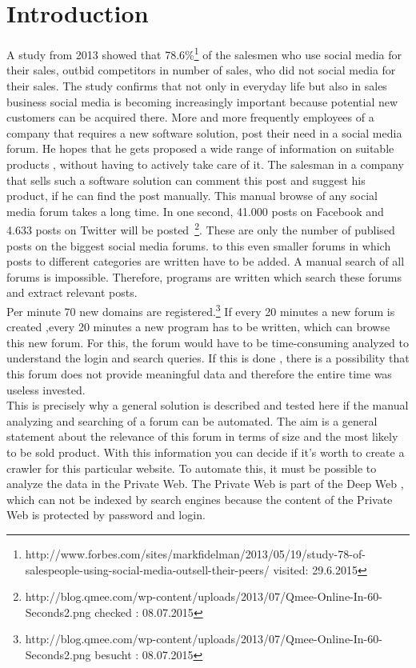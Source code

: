 \section{Introduction}
A study from 2013 showed that 78.6\%\footnote{http://www.forbes.com/sites/markfidelman/2013/05/19/study-78-of-salespeople-using-social-media-outsell-their-peers/ visited: 29.6.2015} of the salesmen who use social media for their sales, outbid competitors in number of sales, who did not social media for their sales.
The study confirms that not only in everyday life but also in sales business social media is becoming increasingly important because potential new customers can be acquired there. More and more frequently employees of a company that requires a new software solution, post their need in a social media forum. He hopes that he gets proposed a wide range of information on suitable products , without having to actively take care of it. The salesman in a company that sells such a software solution can comment this post and suggest his product, if he can find the post manually.
This manual browse of any social media forum takes a long time. In one second, 41.000 posts on Facebook and 4.633 posts on Twitter will be posted~\footnote{http://blog.qmee.com/wp-content/uploads/2013/07/Qmee-Online-In-60-Seconds2.png checked : 08.07.2015}. These are only the number of publised posts on the biggest social media forums. to this even smaller forums in which posts to different categories are written have to be added. A manual search of all forums is impossible. Therefore, programs are written which search these forums and extract relevant posts.\\
Per minute 70 new domains are registered.\footnote{http://blog.qmee.com/wp-content/uploads/2013/07/Qmee-Online-In-60-Seconds2.png besucht : 08.07.2015}
If every 20 minutes a new forum is created ,every 20 minutes a new program has to be written, which can browse this new forum. For this, the forum would have to be time-consuming analyzed to understand the login and search queries. If this is done , there is a possibility that this forum does not provide meaningful data and therefore the entire time was useless invested. \\
This is precisely why a general solution is described and tested here if the manual analyzing and searching of a forum can be automated. The aim is a general statement about the relevance of this forum in terms of size and the most likely to be sold product. With this information you can decide if it's worth to create a crawler for this particular website. To automate this, it must be possible to analyze the data in the Private Web. The Private Web is part of the Deep Web , which can not be indexed by search engines because the content of the Private Web is protected by password and login.
